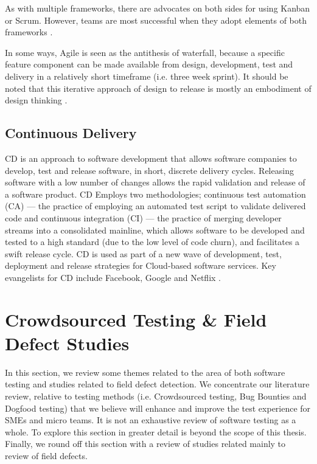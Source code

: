 As with multiple frameworks, there are advocates on both sides for using Kanban or Scrum. However, teams are most successful when they adopt elements of both frameworks \cite{kniberg2009kanban}.

In some ways, Agile is seen as the antithesis of waterfall, because a specific feature component can be made available from design, development, test and delivery in a relatively short timeframe (i.e. three week sprint). It should be noted that this iterative approach of design to release is mostly an embodiment of design thinking \cite{lindberg2011design}.

\subsection{Continuous Delivery}
CD is an approach to software development that allows software companies to develop, test and release software, in short, discrete delivery cycles. Releasing software with a low number of changes allows the rapid validation and release of a software product. CD Employs two methodologies; continuous test automation (CA) ---  the practice of employing an automated test script to validate delivered code and continuous integration (CI) --- the practice of merging developer streams into a consolidated mainline, which allows software to be developed and tested to a high standard (due to the low level of code churn), and facilitates a swift release cycle. CD is used as part of a new wave of development, test, deployment and release strategies for Cloud-based software services. Key evangelists for CD include Facebook, Google and Netflix \cite{quora2014}. 

\section{Crowdsourced Testing \& Field Defect Studies}

In this section, we review some themes related to the area of both software testing and studies related to field defect detection. We concentrate our literature review, relative to testing methods (i.e. Crowdsourced testing, Bug Bounties and Dogfood testing) that we believe will enhance and improve the test experience for SMEs and micro teams. It is not an exhaustive review of software testing as a whole. To explore this section in greater detail is beyond the scope of this thesis. Finally, we round off this section with a review of studies related mainly to review of field defects.


